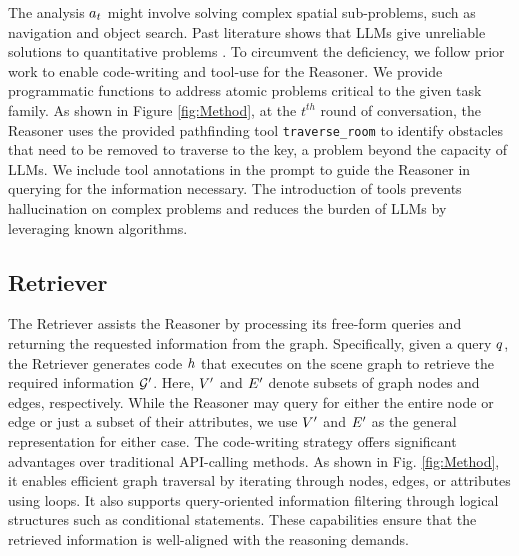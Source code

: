 The analysis $a_t$ might involve solving complex spatial sub-problems, such as navigation and object search. Past literature shows that LLMs give unreliable solutions to quantitative problems \citep{llmMathReason}. To circumvent the deficiency, we follow prior work \citep{toolformer, ART} to enable code-writing and tool-use for the Reasoner. We provide programmatic functions to address atomic problems critical to the given task family. As shown in Figure \ref{fig:Method}, at the $t^{th}$ round of conversation, the Reasoner uses the provided pathfinding tool \texttt{\small traverse\_room} to identify obstacles that need to be removed to traverse to the key, a problem beyond the capacity of LLMs. We include tool annotations in the prompt to guide the Reasoner in querying for the information necessary. 
The introduction of tools prevents hallucination on complex problems and reduces the burden of LLMs by leveraging known algorithms.


\subsection{Retriever}

The Retriever assists the Reasoner by processing its free-form queries and returning the requested information from the graph. 
Specifically, given a query $q$, the Retriever generates code $h$ that executes on the scene graph to retrieve the required information ${\mathcal{G}}^\prime$. Here, $V^\prime$ and $E^\prime$ denote subsets of graph nodes and edges, respectively. While the Reasoner may query for either the entire node or edge or just a subset of their attributes, we use $V^\prime$ and $E^\prime$ as the general representation for either case.
The code-writing strategy offers significant advantages over traditional API-calling methods.
As shown in Fig. \ref{fig:Method}, it enables efficient graph traversal by iterating through nodes, edges, or attributes using loops. 
It also supports query-oriented information filtering through logical structures such as conditional statements. 
These capabilities ensure that the retrieved information is well-aligned with the reasoning demands.

